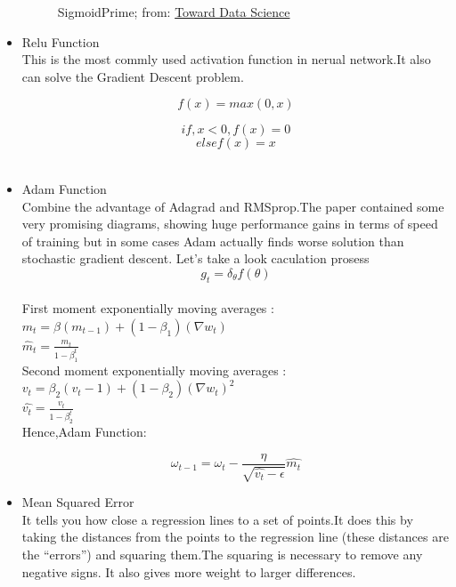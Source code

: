 \documentclass[14pt,a4paper]{report}  %
\begin{document}
\begin{itemize}
\begin{figure}[hbt!]
\begin{center}
\caption{SigmoidPrime; from: \href{https://towardsdatascience.com/derivative-of-the-sigmoid-function-536880cf918e}{Toward Data Science}}
\end{center}
\end{figure}
\item Relu Function\\
\qquad This is the most commly used activation function in nerual network.It also can solve the Gradient Descent problem.
\begin{Large}$$f(x)=max(0,x)$$\end{Large}
$$if , x<0 , f(x)=0$$
$$else f(x)=x$$\\

\item Adam Function\\
\qquad Combine the advantage of Adagrad and RMSprop.The paper contained some very promising diagrams, showing huge performance gains in terms of speed of training but in some cases Adam actually finds worse solution than stochastic gradient descent. Let's take a look caculation prosess \\[6pt]
$$g_t=\delta_{\theta}f(\theta)$$\\
First moment exponentially moving averages : $m_t =\beta(m_{t-1})+(1-\beta_1)(\nabla{w_t})$\\[6pt]
$\hat m_t=\frac{m_t}{1-\beta_1^t}$\\[6pt]
Second moment exponentially moving averages :$v_t=\beta_2(v_t-1)+(1-\beta_2)(\nabla{w_t})^2$\\[6pt]
$\hat{v_t}=\frac{v_t}{1-\beta_2^t}$\\[6pt]
Hence,Adam Function:\\[6pt]
\begin{Large}$$\omega_{t-1}=\omega_t-\frac{\eta}{\sqrt{\hat{v_t}-\epsilon}}\hat{m_t}$$\end{Large}
\item Mean Squared Error\\
\qquad It tells you how close a regression lines to a set of points.It does this by taking the distances from the points to the regression line (these distances are the “errors”) and squaring them.The squaring is necessary to remove any negative signs. It also gives more weight to larger differences.

\end{itemize}
\end{document}
